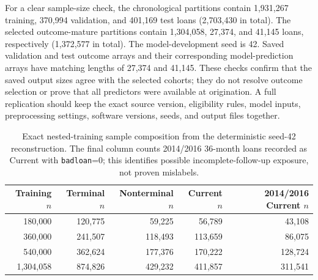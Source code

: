 \documentclass[10pt]{article}
\begin{document}
For a clear sample-size check, the chronological partitions contain 1,931,267 training, 370,994 validation, and 401,169 test loans (2,703,430 in total). The selected outcome-mature partitions contain 1,304,058, 27,374, and 41,145 loans, respectively (1,372,577 in total). The model-development seed is 42. Saved validation and test outcome arrays and their corresponding model-prediction arrays have matching lengths of 27,374 and 41,145. These checks confirm that the saved output sizes agree with the selected cohorts; they do not resolve outcome selection or prove that all predictors were available at origination. A full replication should keep the exact source version, eligibility rules, model inputs, preprocessing settings, software versions, seeds, and output files together.

\begin{table}[!ht]
\centering
\caption{Exact nested-training sample composition from the deterministic seed-42 reconstruction. The final column counts 2014/2016 36-month loans recorded as Current with \texttt{badloan}=0; this identifies possible incomplete-follow-up exposure, not proven mislabels.}
\label{tab:r2_sample_composition}
\begin{tabular}{rrrrr}
\toprule
Training $n$ & Terminal $n$ & Nonterminal $n$ & Current $n$ & 2014/2016 Current $n$ \\
\midrule
180,000 & 120,775 & 59,225 & 56,789 & 43,108 \\
360,000 & 241,507 & 118,493 & 113,659 & 86,075 \\
540,000 & 362,624 & 177,376 & 170,222 & 128,724 \\
1,304,058 & 874,826 & 429,232 & 411,857 & 311,541 \\
\bottomrule
\end{tabular}
\end{table}
\end{document}
